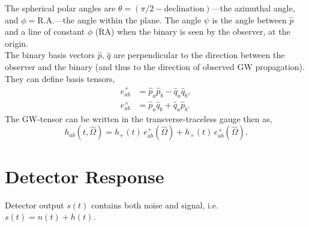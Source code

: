 \documentclass[10pt, oneside, onecolumn]{article}   	%
\begin{document}
    The spherical polar angles are $\theta = (\pi/2 - \mathrm{declination})$---the azimuthal angle, and $\phi = \mathrm{R.A.}$---the angle within the plane.  The angle $\psi$ is the angle between $\hat{p}$ and a line of constant $\phi$ (RA) when the binary is seen by the observer, at the origin. \\

    The binary basis vectors $\hat{p}$, $\hat{q}$ are perpendicular to the direction between the observer and the binary (and thus to the direction of observed GW propagation).  They can define basis tensors,
    \begin{align}
    e^{+}_{ab} & = \hat{p}_a \hat{p}_b - \hat{q}_a \hat{q}_b, \nonumber \\
    e^{\times}_{ab} & = \hat{p}_a \hat{q}_b + \hat{q}_a \hat{p}_b.
    \end{align}
    The GW-tensor can be written in the transverse-traceless gauge then as,
    \begin{equation}
    h_{ab}(t, \hat{\Omega}) = h_{+}(t) \, e^{+}_{ab}(\hat{\Omega}) + h_{\times}(t) \, e^{\times}_{ab}(\hat{\Omega}).
    \end{equation}


    \section{Detector Response}
    \label{sec:det_resp}
    Detector output $s(t)$ contains both noise and signal, i.e.~$s(t) = n(t) + h(t)$.

\end{document}
